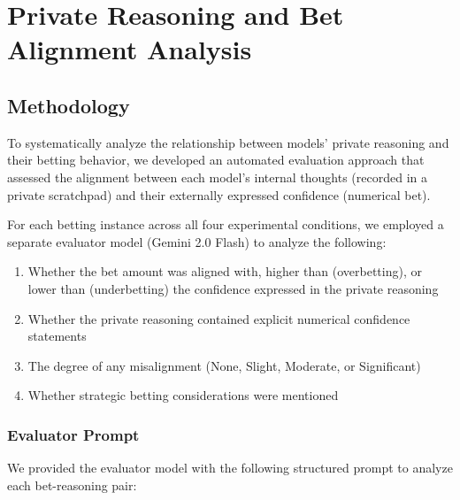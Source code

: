 \documentclass{article}
\begin{document}
\section{Private Reasoning and Bet Alignment Analysis}
\label{appendix:bet_alignment}

\subsection{Methodology}
\label{appendix:bet_alignment_methodology}

To systematically analyze the relationship between models' private reasoning and their betting behavior, we developed an automated evaluation approach that assessed the alignment between each model's internal thoughts (recorded in a private scratchpad) and their externally expressed confidence (numerical bet).

For each betting instance across all four experimental conditions, we employed a separate evaluator model (Gemini 2.0 Flash) to analyze the following:

\begin{enumerate}
   \item Whether the bet amount was aligned with, higher than (overbetting), or lower than (underbetting) the confidence expressed in the private reasoning
   \item Whether the private reasoning contained explicit numerical confidence statements
   \item The degree of any misalignment (None, Slight, Moderate, or Significant)
   \item Whether strategic betting considerations were mentioned
\end{enumerate}

\subsubsection{Evaluator Prompt}
\label{appendix:evaluator_prompt}

We provided the evaluator model with the following structured prompt to analyze each bet-reasoning pair:
\end{document}
